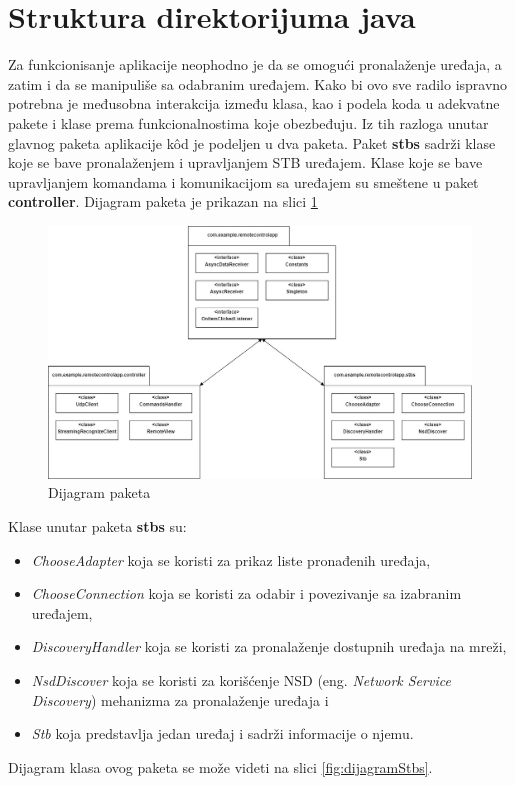 \documentclass[implementacija.tex]{subfiles}
\begin{document}
\section{Struktura direktorijuma java}
Za funkcionisanje aplikacije neophodno je da se omogući pronalaženje uređaja, a zatim i da se manipuliše sa odabranim uređajem. Kako bi ovo sve radilo ispravno potrebna je međusobna interakcija između klasa, kao i podela koda u adekvatne pakete i klase prema funkcionalnostima koje obezbeđuju. Iz tih razloga unutar glavnog paketa aplikacije k\^{o}d je podeljen u dva paketa. Paket \textbf{stbs} sadrži klase koje se bave pronalaženjem i upravljanjem STB uređajem. Klase koje se bave upravljanjem komandama i komunikacijom sa uređajem su smeštene u paket \textbf{controller}.  Dijagram paketa je prikazan na slici \ref{fig:dijagramPaketa}


\begin{figure}[!ht]
  \centering
  \includegraphics[width=\textwidth]{Implementacija/dijagrami/pakage_diagram.jpg}
  \caption{Dijagram paketa}
  \label{fig:dijagramPaketa}
\end{figure}

Klase unutar paketa \textbf{stbs} su:
\begin{itemize}
\item \textit{ChooseAdapter} koja se koristi za prikaz liste pronađenih uređaja,
\item \textit{ChooseConnection} koja se koristi za odabir i povezivanje sa izabranim uređajem,
\item \textit{DiscoveryHandler} koja se koristi za pronalaženje dostupnih uređaja na mreži,
\item \textit{NsdDiscover} koja se koristi za korišćenje NSD (eng. \textit{Network Service Discovery}) mehanizma za pronalaženje uređaja i
\item \textit{Stb} koja predstavlja jedan uređaj i sadrži informacije o njemu.
\end{itemize}
Dijagram klasa ovog paketa se može videti na slici \ref{fig:dijagramStbs}.
\end{document}
